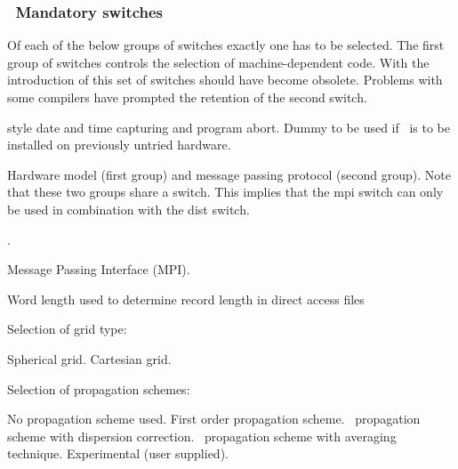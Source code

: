 \vsssub
\subsubsection{~Mandatory switches} \label{sub:man_switch}
\vsssub

Of each of the below groups of switches exactly one has to be selected. The
first group of switches controls the selection of machine-dependent code. With
the introduction of  this set of switches should have become
obsolete. Problems with some compilers have prompted the retention of the
second switch.
\begin{slist}
 { style date and time capturing and program
           abort.}
 {Dummy to be used if \ws\ is to be installed on
           previously untried hardware.}
\end{slist}

\noindent
Hardware model (first group) and message passing protocol (second group). Note
that these two groups share a switch. This implies that the {\sc mpi} switch
can only be used in combination with the {\sc dist} switch.
\begin{slist}
.
\end{slist}

\begin{slist}
 {Message Passing Interface (MPI).}
\end{slist}

\noindent
Word length used to determine record length in direct access files
\begin{slist}
\end{slist}

\pb \noindent
Selection of grid type:
\begin{slist}
 {Spherical grid.}
 {Cartesian grid.}
\end{slist}

\noindent
Selection of propagation schemes:
\begin{slist}
 {No propagation scheme used.}
 {First order propagation scheme.}
 {\uq\ propagation scheme with \cite{art:BH87}
           dispersion correction.}
 {\uq\ propagation scheme with \cite{tol:OMOD02b}
          averaging technique.}
 {Experimental (user supplied).}
\end{slist}

